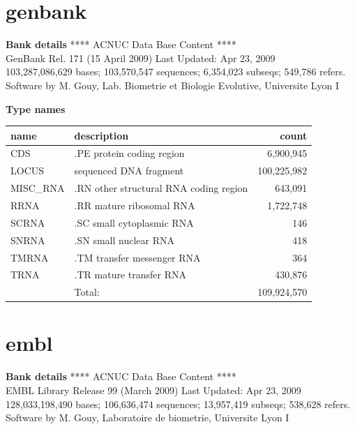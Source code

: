 \documentclass{article}
\begin{document}
\begin{Schunk}
\section{ genbank }
\textbf{Bank details}
             ****     ACNUC Data Base Content      ****                         \\
          GenBank Rel. 171 (15 April 2009) Last Updated: Apr 23, 2009\\
103,287,086,629 bases; 103,570,547 sequences; 6,354,023 subseqs; 549,786 refers.\\
Software by M. Gouy, Lab. Biometrie et Biologie Evolutive, Universite Lyon I 

\textbf{Type names}
\noindent\begin{tabular}{llr}
\hline \hline
name & description & count \\
\hline
CDS  &  .PE protein coding region  &  6,900,945 \\
LOCUS  &  sequenced DNA fragment  &  100,225,982 \\
MISC\_RNA  &  .RN other structural RNA coding region  &  643,091 \\
RRNA  &  .RR mature ribosomal RNA  &  1,722,748 \\
SCRNA  &  .SC small cytoplasmic RNA  &  146 \\
SNRNA  &  .SN small nuclear RNA  &  418 \\
TMRNA  &  .TM transfer messenger RNA  &  364 \\
TRNA  &  .TR mature transfer RNA  &  430,876 \\
\hline
 & Total: & 109,924,570 \\
\hline \hline
\end{tabular}

\section{ embl }
\textbf{Bank details}
             ****     ACNUC Data Base Content      ****                         \\
        EMBL Library Release 99 (March 2009) Last Updated: Apr 23, 2009\\
128,033,198,490 bases; 106,636,474 sequences; 13,957,419 subseqs; 538,628 refers.\\
Software by M. Gouy, Laboratoire de biometrie, Universite Lyon I 


\end{Schunk}
\end{document}
